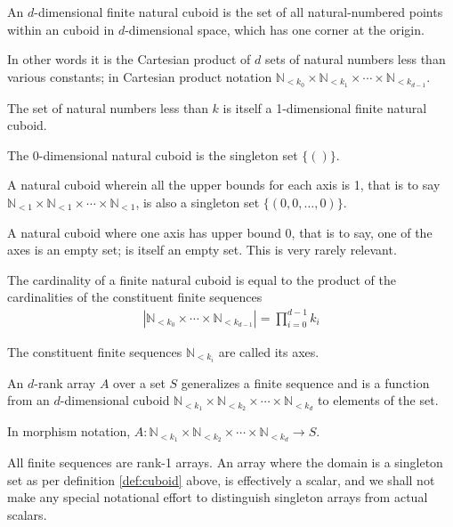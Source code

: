 \documentclass{DIKU-report-variant}
\newcommand\Nat{\mathbb{N}}
\begin{document}
\begin{definition}
  \label{def:cuboid}
  An \(d\)-dimensional finite natural cuboid is the set of all natural-numbered points
  within an cuboid in \(d\)-dimensional space, which has one corner at the origin.

  In other words it is the Cartesian product of \(d\) sets of natural numbers
  less than various constants; in Cartesian product notation
  \(\Nat_{<k_0} \times \Nat_{<k_1} \times \cdots \times \Nat_{<k_{d-1}}\).

  The set of natural numbers less than \(k\) is itself a 1-dimensional finite natural cuboid.

  The 0-dimensional natural cuboid is the singleton set \(\{()\}\).

  A natural cuboid wherein all the upper bounds for each axis is 1, that
  is to say \(\Nat_{<1} \times \Nat_{<1} \times \cdots \times \Nat_{<1}\), is
  also a singleton set \(\{(0, 0, \dots, 0)\}\).

  A natural cuboid where one axis has upper bound 0, that is to
  say, one of the axes is an empty set; is itself an empty set. This is very rarely relevant.
  
  The cardinality of a finite natural cuboid is equal to the product of
  the cardinalities of the constituent finite sequences
  \begin{align*}
  |\Nat_{<k_0} \times \cdots \times \Nat_{<k_{d-1}}| = \prod_{i=0}^{d-1} k_i
  \end{align*}

  The constituent finite sequences \(\Nat_{<k_i}\) are called its axes.
\end{definition}

\begin{definition}
  \label{def:array}
  An \(d\)-rank array \(A\) over a set \(S\) generalizes a finite sequence and
  is a function from an \(d\)-dimensional cuboid
  \(\Nat_{<k_1} \times \Nat_{<k_2} \times \cdots \times \Nat_{<k_d}\) to elements of the set.

  In morphism notation, \(A : \Nat_{<k_1} \times \Nat_{<k_2} \times \cdots \times \Nat_{<k_d} \to S\).

  All finite sequences are rank-1 arrays. An array where the domain is a singleton
  set as per definition \ref{def:cuboid} above, is effectively a scalar, and we shall
  not make any special notational effort to distinguish singleton arrays from actual scalars.
\end{definition}
\end{document}
